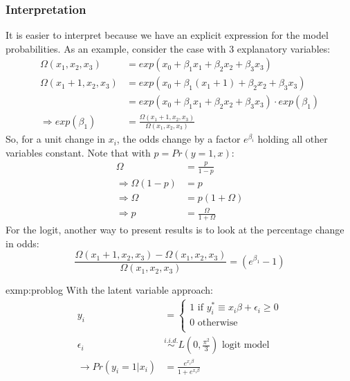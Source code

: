 	\subsubsection{Interpretation}\label{sec:binint}
			It is easier to interpret because we have an explicit expression for the model probabilities. As an example, consider the case with 3 explanatory variables:
			\begin{align*}
				\Omega(x_1,x_2,x_3)&=exp(x_0+\beta_1 x_1+\beta_2 x_2 + \beta_3 x_3)\\
				\Omega(x_1+1,x_2,x_3)&=exp(x_0+\beta_1 (x_1+1)+\beta_2 x_2 + \beta_3 x_3)\\
				&=exp(x_0+\beta_1 x_1+\beta_2 x_2 + \beta_3 x_3)\cdot exp(\beta_1)\\
				\Rightarrow exp(\beta_1)&=\frac{\Omega(x_1+1,x_2,x_3)}{\Omega(x_1,x_2,x_3)}
			\end{align*}
			So, for a unit change in $x_i$, the odds change by a factor $e^{\beta_i}$ holding all other variables constant. Note that with $p=Pr(y=1,x)$:
			\begin{align*}
				\Omega&=\frac{p}{1-p}\\
				\Rightarrow \Omega(1-p)&=p\\
				\Rightarrow \Omega&=p(1+\Omega)\\
				\Rightarrow p&=\frac{\Omega}{1+\Omega}			
			\end{align*}
			For the logit, another way to present results is to look at the percentage change in odds:
			\begin{equation*}
				\frac{\Omega(x_1+1,x_2,x_3)-\Omega(x_1,x_2,x_3)}{\Omega(x_1,x_2,x_3)}=(e^{\beta_1}-1)
			\end{equation*}
			\begin{exmp}{exmp:problog}
				With the latent variable approach:
				\begin{align*}
					y_i&=\begin{cases}
						1 \text{ if } y_i^*\equiv x_i \beta + \epsilon_i \geq 0\\
						0 \text{ otherwise}\\
					\end{cases}\\
					\epsilon_i  &\overset{i.i.d.}{\sim}L(0,\frac{\pi^2}{3})\text{ logit model}\\
					\longrightarrow Pr(y_i=1|x_i)&=\frac{e^{x_i \beta}}{1+e^{x_i \beta}}
				\end{align*}
			\end{exmp}
